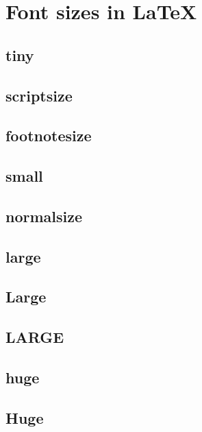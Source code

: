 \documentclass[10pt, a4paper, draft]{article}
\begin{document}
\section{Font sizes in \LaTeX}

\subsection{tiny}

{\tiny \blindtext\par}

\subsection{scriptsize}

{\scriptsize \blindtext\par}

\subsection{footnotesize}

{\footnotesize \blindtext\par}

\subsection{small}

{\small \blindtext\par}

\subsection{normalsize}

{\normalsize \blindtext\par}

\subsection{large}

{\large \blindtext\par}

\subsection{Large}

{\Large \blindtext\par}

\subsection{LARGE}

{\LARGE \blindtext\par}

\subsection{huge}

{\huge \blindtext\par}

\subsection{Huge}

{\Huge \blindtext\par}
\end{document}
